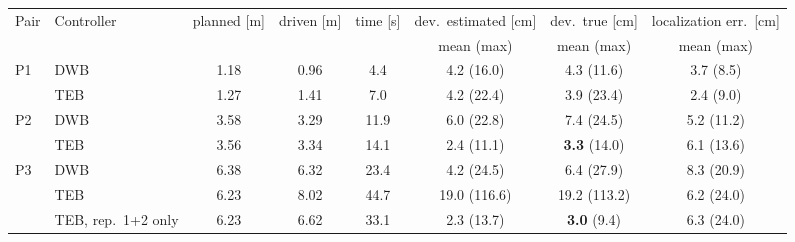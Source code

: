 \documentclass[10pt]{article}
\begin{document}
\begin{tabular}{llcccccc}
\toprule
Pair & Controller & planned [m] & driven [m] & time [s] & dev.\ estimated [cm] & dev.\ true [cm] & localization err.\ [cm] \\
     &            &             &            &          & mean (max)            & mean (max)       & mean (max) \\
\midrule
P1 & DWB & 1.18 & 0.96 & 4.4  & 4.2 (16.0) & 4.3 (11.6) & 3.7 (8.5) \\
   & TEB & 1.27 & 1.41 & 7.0  & 4.2 (22.4) & 3.9 (23.4) & 2.4 (9.0) \\
P2 & DWB & 3.58 & 3.29 & 11.9 & 6.0 (22.8) & 7.4 (24.5) & 5.2 (11.2) \\
   & TEB & 3.56 & 3.34 & 14.1 & 2.4 (11.1) & \textbf{3.3} (14.0) & 6.1 (13.6) \\
P3 & DWB & 6.38 & 6.32 & 23.4 & 4.2 (24.5) & 6.4 (27.9) & 8.3 (20.9) \\
   & TEB & 6.23 & 8.02 & 44.7 & 19.0 (116.6) & 19.2 (113.2) & 6.2 (24.0) \\
   & TEB, rep.\ 1+2 only & 6.23 & 6.62 & 33.1 & 2.3 (13.7) & \textbf{3.0} (9.4) & 6.3 (24.0) \\
\bottomrule
\end{tabular}
\end{document}
